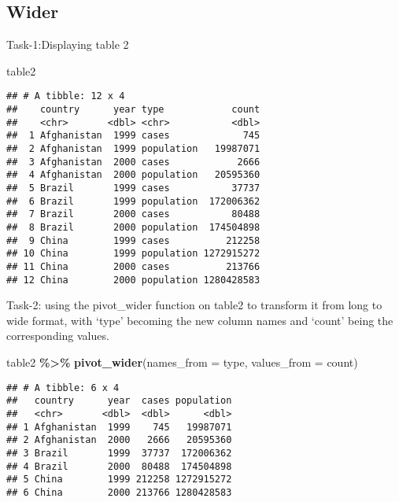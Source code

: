 \documentclass[
]{article}
\newenvironment{Shaded}{\begin{snugshade}}{\end{snugshade}}
\newcommand{\AttributeTok}[1]{\textcolor[rgb]{0.13,0.29,0.53}{#1}}
\newcommand{\FunctionTok}[1]{\textcolor[rgb]{0.13,0.29,0.53}{\textbf{#1}}}
\newcommand{\NormalTok}[1]{#1}
\newcommand{\SpecialCharTok}[1]{\textcolor[rgb]{0.81,0.36,0.00}{\textbf{#1}}}
\begin{document}
\hypertarget{wider}{%
\subsection{Wider}\label{wider}}

Task-1:Displaying table 2

\begin{Shaded}
\begin{Highlighting}[]
\NormalTok{table2}
\end{Highlighting}
\end{Shaded}

\begin{verbatim}
## # A tibble: 12 x 4
##    country      year type            count
##    <chr>       <dbl> <chr>           <dbl>
##  1 Afghanistan  1999 cases             745
##  2 Afghanistan  1999 population   19987071
##  3 Afghanistan  2000 cases            2666
##  4 Afghanistan  2000 population   20595360
##  5 Brazil       1999 cases           37737
##  6 Brazil       1999 population  172006362
##  7 Brazil       2000 cases           80488
##  8 Brazil       2000 population  174504898
##  9 China        1999 cases          212258
## 10 China        1999 population 1272915272
## 11 China        2000 cases          213766
## 12 China        2000 population 1280428583
\end{verbatim}

Task-2: using the pivot\_wider function on table2 to transform it from
long to wide format, with `type' becoming the new column names and
`count' being the corresponding values.

\begin{Shaded}
\begin{Highlighting}[]
\NormalTok{table2 }\SpecialCharTok{\%\textgreater{}\%}
    \FunctionTok{pivot\_wider}\NormalTok{(}\AttributeTok{names\_from =}\NormalTok{ type, }\AttributeTok{values\_from =}\NormalTok{ count)}
\end{Highlighting}
\end{Shaded}

\begin{verbatim}
## # A tibble: 6 x 4
##   country      year  cases population
##   <chr>       <dbl>  <dbl>      <dbl>
## 1 Afghanistan  1999    745   19987071
## 2 Afghanistan  2000   2666   20595360
## 3 Brazil       1999  37737  172006362
## 4 Brazil       2000  80488  174504898
## 5 China        1999 212258 1272915272
## 6 China        2000 213766 1280428583
\end{verbatim}
\end{document}
